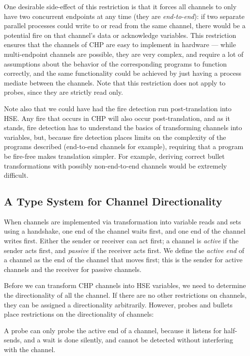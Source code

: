 \documentclass[times, 10pt]{article}
\begin{document}
One desirable side-effect of this restriction is that it forces all channels to
only have two concurrent endpoints at any time (they are \emph{end-to-end}):  if
two separate parallel processes could write to or read from the same channel,
there would be a potential fire on that channel's data or acknowledge variables.
This restriction ensures that the channels of CHP are easy to implement in
hardware --- while multi-endpoint channels are possible, they are very complex,
and require a lot of assumptions about the behavior of the corresponding
programs to function correctly, and the same functionality could be achieved by
just having a process mediate between the channels.  Note that this restriction
does not apply to probes, since they are strictly read only.

Note also that we could have had the fire detection run post-translation into
HSE.  Any fire that occurs in CHP will also occur post-translation, and as it
stands, fire detection has to understand the basics of transforming channels
into variables, but, because fire detection places limits on the complexity of
the programs described (end-to-end channels for example), requiring that a
program be fire-free makes translation simpler.  For example, deriving correct
bullet transformations with possibly non-end-to-end channels would be extremely
difficult.

\subsection{A Type System for Channel Directionality}

When channels are implemented via transformation into variable reads and sets
using a handshake, one end of the channel waits first, and one end of the
channel writes first.  Either the sender or receiver can act first; a channel is
\emph{active} if the sender acts first, and \emph{passive} if the receiver acts
first.  We define the \emph{active end} of a channel as the end of the channel
that moves first; this is the sender for active channels and the receiver for
passive channels.

Before we can transform CHP channels into HSE variables, we need to determine
the directionality of all the channel.  If there are no other restrictions on
channels, they can be assigned a directionality arbitrarily.  However, probes
and bullets place restrictions on the directionality of channels:

A probe can only probe the active end of a channel, because it listens for
half-sends, and a wait is done silently, and cannot be detected without
interfering with the channel.
\end{document}
